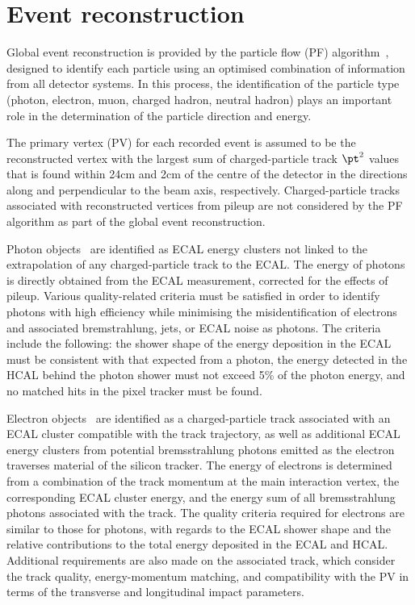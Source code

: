 \section{Event reconstruction}
\label{sec:event_reconstruction}

Global event reconstruction is provided by the particle flow (PF)
algorithm~\cite{CMS-PAS-PFT-09-001,CMS-PAS-PFT-10-001}, designed to
identify each particle using an optimised combination of information
from all detector systems. In this process, the identification of the
particle type (photon, electron, muon, charged hadron, neutral hadron)
plays an important role in the determination of the particle direction
and energy.

The primary vertex (PV) for each recorded event is assumed to be the
reconstructed vertex with the largest sum of charged-particle track
$\pt^2$ values that is found within 24\unit{cm} and 2\unit{cm} of the
centre of the detector in the directions along and perpendicular to
the beam axis, respectively. Charged-particle tracks associated with
reconstructed vertices from pileup are not considered by the PF
algorithm as part of the global event reconstruction.

Photon objects~\cite{CMS:EGM-14-001} are identified as ECAL energy
clusters not linked to the extrapolation of any charged-particle track
to the ECAL. The energy of photons is directly obtained from the ECAL
measurement, corrected for the effects of pileup.  Various
quality-related criteria must be satisfied in order to identify
photons with high efficiency while minimising the misidentification of
electrons and associated bremstrahlung, jets, or ECAL noise as
photons. The criteria include the following: the shower shape of the
energy deposition in the ECAL must be consistent with that expected
from a photon, the energy detected in the HCAL behind the photon
shower must not exceed 5\% of the photon energy, and no matched hits
in the pixel tracker must be found.

Electron objects~\cite{Khachatryan:2015hwa} are identified as a
charged-particle track associated with an ECAL cluster compatible with
the track trajectory, as well as additional ECAL energy clusters from
potential bremsstrahlung photons emitted as the electron traverses
material of the silicon tracker. The energy of electrons is determined
from a combination of the track momentum at the main interaction
vertex, the corresponding ECAL cluster energy, and the energy sum of
all bremsstrahlung photons associated with the track. The quality
criteria required for electrons are similar to those for photons, with
regards to the ECAL shower shape and the relative contributions to the
total energy deposited in the ECAL and HCAL. Additional requirements
are also made on the associated track, which consider the track
quality, energy-momentum matching, and compatibility with the PV in
terms of the transverse and longitudinal impact parameters.

